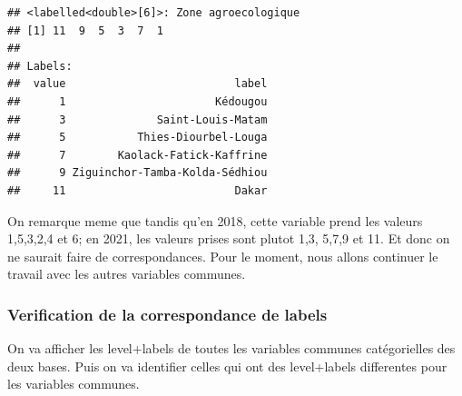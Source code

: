 \documentclass[
]{article}
\begin{document}
\begin{verbatim}
## <labelled<double>[6]>: Zone agroecologique
## [1] 11  9  5  3  7  1
## 
## Labels:
##  value                          label
##      1                       Kédougou
##      3              Saint-Louis-Matam
##      5           Thies-Diourbel-Louga
##      7        Kaolack-Fatick-Kaffrine
##      9 Ziguinchor-Tamba-Kolda-Sédhiou
##     11                          Dakar
\end{verbatim}

On remarque meme que tandis qu'en 2018, cette variable prend les valeurs
1,5,3,2,4 et 6; en 2021, les valeurs prises sont plutot 1,3, 5,7,9 et
11. Et donc on ne saurait faire de correspondances. Pour le moment, nous
allons continuer le travail avec les autres variables communes.

\hypertarget{verification-de-la-correspondance-de-labels}{%
\subsubsection{Verification de la correspondance de
labels}\label{verification-de-la-correspondance-de-labels}}

On va afficher les level+labels de toutes les variables communes
catégorielles des deux bases. Puis on va identifier celles qui ont des
level+labels differentes pour les variables communes.
\end{document}
